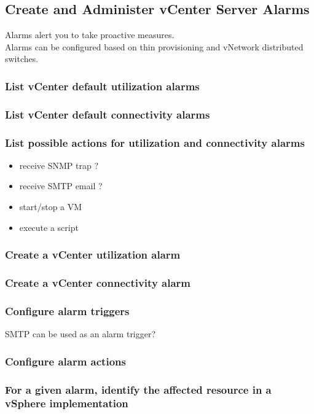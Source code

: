 \subsection{Create and Administer vCenter Server Alarms}

Alarms alert you to take proactive measures.\\

Alarms can be configured based on thin provisioning and vNetwork distributed
switches.

\subsubsection{List vCenter default utilization alarms}

\subsubsection{List vCenter default connectivity alarms}

\subsubsection{List possible actions for utilization and connectivity alarms}

\begin{itemize}
\item receive SNMP trap ?
\item receive SMTP email ?
\item start/stop a VM
\item execute a script
\end{itemize}

\subsubsection{Create a vCenter utilization alarm}

\subsubsection{Create a vCenter connectivity alarm}

\subsubsection{Configure alarm triggers}

SMTP can be used as an alarm trigger?

\subsubsection{Configure alarm actions}

\subsubsection{For a given alarm, identify the affected resource in a vSphere implementation}
